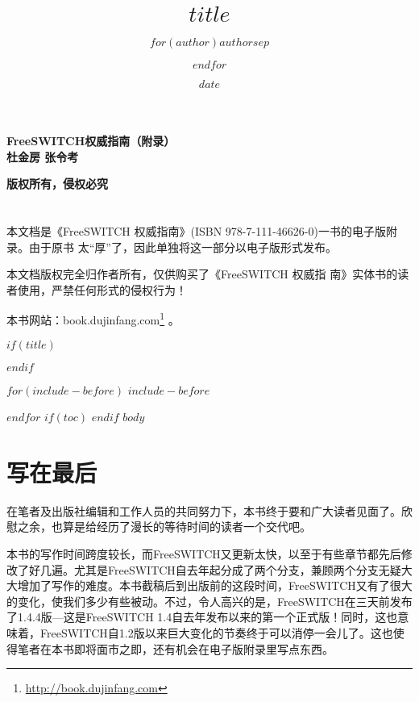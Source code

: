 \documentclass[$if(fontsize)$$fontsize$,$endif$$if(lang)$$lang$,$endif$CJKutf8]{$documentclass$}
\title{$title$}
\author{$for(author)$$author$$sep$ \and $endfor$}
\date{$date$}
\renewcommand{\href}[2]{#2\footnote{\url{#1}}}
\begin{document}

\newcommand{\thetitle}{FreeSWITCH权威指南（附录）}
\newcommand{\theauthor}{杜金房}
\newcommand{\theauthors}{杜金房 \quad 张令考}
\newcommand{\thepublisher}{版权所有，侵权必究}


\thispagestyle{empty}

\begin{center}
	{\Huge \bf \thetitle\\[1em]}
  {\Large\bf \theauthors \quad\\[2em]}
\end{center}

\vfill
\begin{center}
	\Large{\bf \thepublisher}
\end{center}


\newpage

\chapter*{}

本文档是《FreeSWITCH 权威指南》(ISBN 978-7-111-46626-0)一书的电子版附录。由于原书 太“厚”了，因此单独将这一部分以电子版形式发布。

本文档版权完全归作者所有，仅供购买了《FreeSWITCH 权威指 南》实体书的读者使用，严禁任何形式的侵权行为！

本书网站：\href{http://book.dujinfang.com}{book.dujinfang.com} 。

\newpage

$if(title)$
\maketitle
$endif$

$for(include-before)$
$include-before$

$endfor$
$if(toc)$
{
\hypersetup{linkcolor=blue}
\tableofcontents
}
$endif$
$body$

\newpage
\chapter*{写在最后}

在笔者及出版社编辑和工作人员的共同努力下，本书终于要和广大读者见面了。欣慰之余，也算是给经历了漫长的等待时间的读者一个交代吧。

本书的写作时间跨度较长，而FreeSWITCH又更新太快，以至于有些章节都先后修改了好几遍。尤其是FreeSWITCH自去年起分成了两个分支，兼顾两个分支无疑大大增加了写作的难度。本书截稿后到出版前的这段时间，FreeSWITCH又有了很大的变化，使我们多少有些被动。不过，令人高兴的是，FreeSWITCH在三天前发布了1.4.4版---这是FreeSWITCH 1.4自去年发布以来的第一个正式版！同时，这也意味着，FreeSWITCH自1.2版以来巨大变化的节奏终于可以消停一会儿了。这也使得笔者在本书即将面市之即，还有机会在电子版附录里写点东西。
\end{document}
